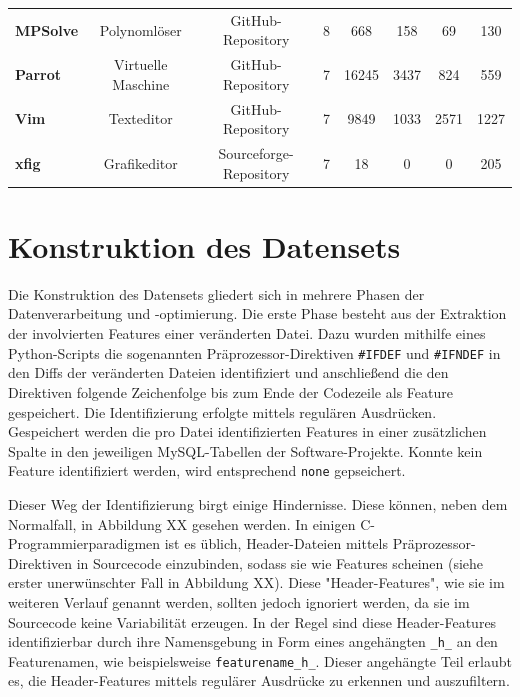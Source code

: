 \begin{table}[]
{\begin{tabular}{lccccccc}
\multicolumn{1}{l|}{\textbf{MPSolve}}  & Polynomlöser         & GitHub-Repository      & 8                   & 668                & 158                  & 69                          & 130                 \\
\multicolumn{1}{l|}{\textbf{Parrot}}   & Virtuelle Maschine   & GitHub-Repository      & 7                   & 16245              & 3437                 & 824                         & 559                 \\
\multicolumn{1}{l|}{\textbf{Vim}}      & Texteditor           & GitHub-Repository      & 7                   & 9849               & 1033                 & 2571                        & 1227                \\
\multicolumn{1}{l|}{\textbf{xfig}}     & Grafikeditor         & Sourceforge-Repository & 7                   & 18                 & 0                    & 0                           & 205                
\end{tabular}%
}
\end{table}

\section{Konstruktion des Datensets}

Die Konstruktion des Datensets gliedert sich in mehrere Phasen der Datenverarbeitung und -optimierung. Die erste Phase besteht aus der Extraktion der involvierten Features einer veränderten Datei. Dazu wurden mithilfe eines Python-Scripts die sogenannten Präprozessor-Direktiven \texttt{\#IFDEF} und \texttt{\#IFNDEF} in den Diffs der veränderten Dateien identifiziert und anschließend die den Direktiven folgende Zeichenfolge bis zum Ende der Codezeile als Feature gespeichert. Die Identifizierung erfolgte mittels regulären Ausdrücken. Gespeichert werden die pro Datei identifizierten Features in einer zusätzlichen Spalte in den jeweiligen MySQL-Tabellen der Software-Projekte. Konnte kein Feature identifiziert werden, wird entsprechend \texttt{none} gepseichert.

Dieser Weg der Identifizierung birgt einige Hindernisse. Diese können, neben dem Normalfall, in Abbildung XX gesehen werden. In einigen C-Programmierparadigmen ist es üblich, Header-Dateien mittels Präprozessor-Direktiven in Sourcecode einzubinden, sodass sie wie Features scheinen (siehe erster unerwünschter Fall in Abbildung XX). Diese "Header-Features", wie sie im weiteren Verlauf genannt werden, sollten jedoch ignoriert werden, da sie im Sourcecode keine Variabilität erzeugen. In der Regel sind diese Header-Features identifizierbar durch ihre Namensgebung in Form eines angehängten \texttt{\_h\_} an den Featurenamen, wie beispielsweise \texttt{featurename\_h\_}. Dieser angehängte Teil erlaubt es, die Header-Features mittels regulärer Ausdrücke zu erkennen und auszufiltern. 

